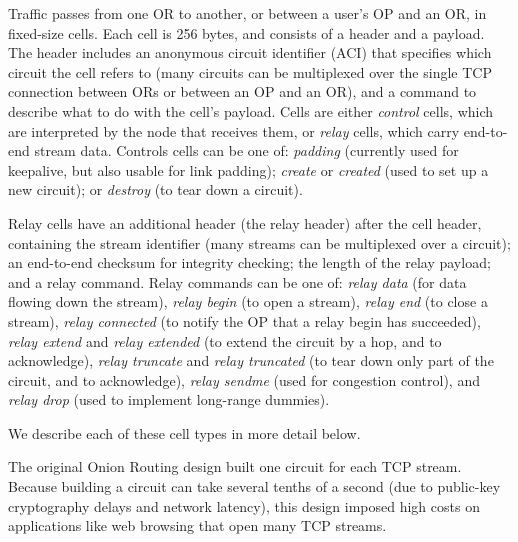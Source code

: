 \documentclass[times,10pt,twocolumn]{article}
\begin{document}
Traffic passes from one OR to another, or between a user's OP and an OR,
in fixed-size cells. Each cell is 256
bytes, and consists of a header and a payload. The header includes an
anonymous circuit identifier (ACI) that specifies which circuit the
cell refers to
(many circuits can be multiplexed over the single TCP connection between
ORs or between an OP and an OR), and a command to describe what to do
with the cell's payload. Cells are either \emph{control} cells, which are
interpreted by the node that receives them, or \emph{relay} cells,
which carry end-to-end stream data. Controls cells can be one of:
\emph{padding} (currently used for keepalive, but also usable for link
padding); \emph{create} or \emph{created} (used to set up a new circuit);
or \emph{destroy} (to tear down a circuit).

Relay cells have an additional header (the relay header) after the
cell header, containing the stream identifier (many streams can
be multiplexed over a circuit); an end-to-end checksum for integrity
checking; the length of the relay payload; and a relay command. Relay
commands can be one of: \emph{relay
data} (for data flowing down the stream), \emph{relay begin} (to open a
stream), \emph{relay end} (to close a stream), \emph{relay connected}
(to notify the OP that a relay begin has succeeded), \emph{relay
extend} and \emph{relay extended} (to extend the circuit by a hop,
and to acknowledge), \emph{relay truncate} and \emph{relay truncated}
(to tear down only part of the circuit, and to acknowledge), \emph{relay
sendme} (used for congestion control), and \emph{relay drop} (used to
implement long-range dummies).

We describe each of these cell types in more detail below.


\label{subsec:circuits}


The original Onion Routing design built one circuit for each
TCP stream.  Because building a circuit can take several tenths of a
second (due to public-key cryptography delays and network latency),
this design imposed high costs on applications like web browsing that
open many TCP streams.
\end{document}
